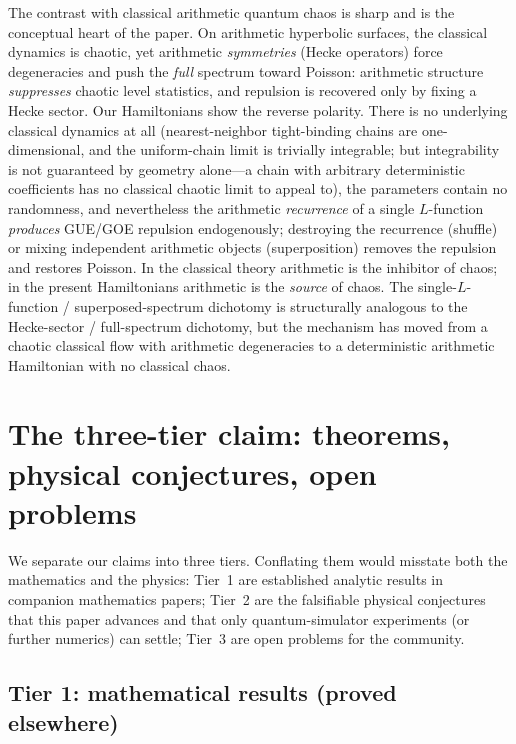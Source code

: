 \documentclass[aps,prx,reprint,floatfix]{revtex4-2}
\begin{document}
The contrast with classical arithmetic quantum chaos is sharp and is the
conceptual heart of the paper. On arithmetic hyperbolic surfaces, the
classical dynamics is chaotic, yet arithmetic \emph{symmetries} (Hecke
operators) force degeneracies and push the \emph{full} spectrum toward
Poisson: arithmetic structure \emph{suppresses} chaotic level statistics,
and repulsion is recovered only by fixing a Hecke sector. Our Hamiltonians
show the reverse polarity. There is no underlying classical dynamics at all
(nearest-neighbor tight-binding chains are one-dimensional, and the
uniform-chain limit is trivially integrable; but integrability is not
guaranteed by geometry alone---a chain with arbitrary deterministic
coefficients has no classical chaotic limit to appeal to), the parameters
contain no randomness, and nevertheless the arithmetic
\emph{recurrence} of a single $L$-function \emph{produces} GUE/GOE
repulsion endogenously; destroying the recurrence (shuffle) or mixing
independent arithmetic objects (superposition) removes the repulsion and
restores Poisson. In the classical theory arithmetic is the inhibitor of
chaos; in the present Hamiltonians arithmetic is the \emph{source} of
chaos. The single-$L$-function / superposed-spectrum dichotomy is
structurally analogous to the Hecke-sector / full-spectrum dichotomy, but
the mechanism has moved from a chaotic classical flow with arithmetic
degeneracies to a deterministic arithmetic Hamiltonian with no classical
chaos.

\section{The three-tier claim: theorems, physical conjectures, open problems}
\label{sec:hypo}

We separate our claims into three tiers. Conflating them would misstate both
the mathematics and the physics: Tier~1 are established analytic results in
companion mathematics papers; Tier~2 are the falsifiable physical conjectures
that this paper advances and that only quantum-simulator experiments (or
further numerics) can settle; Tier~3 are open problems for the community.

\subsection{Tier 1: mathematical results (proved elsewhere)}
\end{document}

